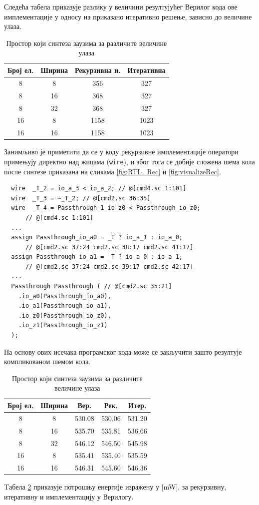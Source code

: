 \documentclass[12pt, a4paper]{article}
\theoremstyle{definition}
\begin{document}
Следећа табела приказује разлику у величини резултујућег Верилог кода ове имплементације у односу на приказано итеративно решење, зависно до величине улаза.

\begin{table}[H]
\centering
 \begin{tabular}{| c | c | c c |}
  \hline
  Број ел. & Ширина & Рекурзивна и. & Итеративна \\
  \hline
  8 & 8  & 356 & 327 \\
  8 & 16 & 368 & 327 \\
  8 & 32 & 368 & 327 \\
  \hline
  16 & 8 & 1158 & 1023 \\
  16 & 16 & 1158 & 1023 \\
  \hline
 \end{tabular}
 \caption{Простор који синтеза заузима за различите величине улаза}
 \label{tab:brojLinija}
\end{table}

Занимљиво је приметити да се у коду рекурзивне имплементације оператори примењују директно над жицама (\verb+wire+), и због тога се добије сложена шема кола после синтезе приказана на сликама \ref{fig:RTL_Rec} и \ref{fig:visualizeRec}.

\begin{verbatim}
  wire  _T_2 = io_a_3 < io_a_2; // @[cmd4.sc 1:101]
  wire  _T_3 = ~_T_2; // @[cmd2.sc 36:35]
  wire  _T_4 = Passthrough_1_io_z0 < Passthrough_io_z0;
      // @[cmd4.sc 1:101]
  ...
  assign Passthrough_io_a0 = _T ? io_a_1 : io_a_0;
      // @[cmd2.sc 37:24 cmd2.sc 38:17 cmd2.sc 41:17]
  assign Passthrough_io_a1 = _T ? io_a_0 : io_a_1;
      // @[cmd2.sc 37:24 cmd2.sc 39:17 cmd2.sc 42:17]
  ...
  Passthrough Passthrough ( // @[cmd2.sc 35:21]
    .io_a0(Passthrough_io_a0),
    .io_a1(Passthrough_io_a1),
    .io_z0(Passthrough_io_z0),
    .io_z1(Passthrough_io_z1)
  );
\end{verbatim}

На основу ових исечака програмског кода може се закључити зашто резултује компликованом шемом кола.
\begin{table}[H]
\centering
 \begin{tabular}{| c | c | c c c |}
  \hline
  Број ел. & Ширина & Вер. & Рек. & Итер. \\
  \hline
  8 & 8  & 530.08 & 530.06 & 531.20 \\
  8 & 16 & 535.70 & 535.81 & 536.66 \\
  8 & 32 & 546.12 & 546.50 & 545.98 \\
  \hline
  16 & 8 & 535.41 & 535.40 & 535.59 \\
  16 & 16 & 546.31 & 545.60 & 546.36 \\
  \hline
 \end{tabular}
 \caption{Простор који синтеза заузима за различите величине улаза}
 \label{tab:potrosnja}
\end{table}
Tабела \ref{tab:potrosnja} приказује потрошњу енергије изражену у [mW], за рекурзивну, итеративну и имплементацију у Верилогу.
\end{document}
